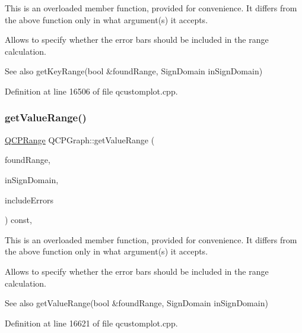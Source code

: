This is an overloaded member function, provided for convenience. It differs from the above function only in what argument(s) it accepts.

Allows to specify whether the error bars should be included in the range calculation.

\begin{DoxySeeAlso}{See also}
get\+Key\+Range(bool \&found\+Range, Sign\+Domain in\+Sign\+Domain) 
\end{DoxySeeAlso}


Definition at line 16506 of file qcustomplot.\+cpp.

\mbox{\label{class_q_c_p_graph_ac23c7702ca836c7055f48e6fc3295ca4}} 
\subsubsection{\texorpdfstring{get\+Value\+Range()}{getValueRange()}}
{\footnotesize\ttfamily \hyperlink{class_q_c_p_range}{Q\+C\+P\+Range} Q\+C\+P\+Graph\+::get\+Value\+Range (\begin{DoxyParamCaption}\item[{bool \&}]{found\+Range,  }\item[{\hyperlink{class_q_c_p_abstract_plottable_a661743478a1d3c09d28ec2711d7653d8}{Sign\+Domain}}]{in\+Sign\+Domain,  }\item[{bool}]{include\+Errors }\end{DoxyParamCaption}) const\hspace{0.3cm}{\ttfamily [protected]}, {\ttfamily [virtual]}}

This is an overloaded member function, provided for convenience. It differs from the above function only in what argument(s) it accepts.

Allows to specify whether the error bars should be included in the range calculation.

\begin{DoxySeeAlso}{See also}
get\+Value\+Range(bool \&found\+Range, Sign\+Domain in\+Sign\+Domain) 
\end{DoxySeeAlso}


Definition at line 16621 of file qcustomplot.\+cpp.

\mbox{\label{class_q_c_p_graph_a4a0fde50b7db9db0a85b5c5b6b10098f}} 
